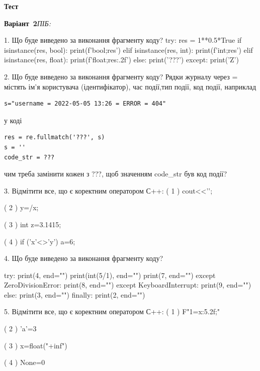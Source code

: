 \documentclass[11pt]{article}
\begin{document}
{\large\textbf{Тест}}

\textbf{Варіант \No\,2}\hfill \textit{ПІБ:}\,\underline{\hspace{60mm}}
\vspace{4mm}

1. Що буде виведено за виконання фрагменту коду?
try:
    res = 1**0.5*True
    if isinstance(res, bool):
        print(f'bool;{res}')
    elif isinstance(res, int):
        print(f'int;{res}')
    elif isinstance(res, float):
        print(f'float;{res:.2f}')
    else:
        print('???')
except:
    print('Z')


2. Що буде виведено за виконання фрагменту коду?
Рядки журналу через = містять ім'я користувача (ідентифікатор), час події,тип події, код події, наприклад
\begin{verbatim}
s="username = 2022-05-05 13:26 = ERROR = 404"
\end{verbatim}
у коді 
\begin{verbatim}
res = re.fullmatch('???', s) 
s = ''
code_str = ??? 
\end{verbatim}
чим треба замінити кожен з ???, щоб значенням code\_str був код події? 




3. %
Відмітити все, що є коректним оператором С++:
( 1 ) cout<<'\n';

( 2 ) y=/x;

( 3 ) int z=3.1415;

( 4 ) if ('x'<>'y') a=6;


4. Що буде виведено за виконання фрагменту коду?

try:
    print(4, end="")
    print(int(5/1), end="")
    print(7, end="")
except ZeroDivisionError: 
    print(8, end="")
except KeyboardInterrupt: 
    print(9, end="")
else:
    print(3, end="")
finally:
    print(2, end="")



5. %
Відмітити все, що є коректним оператором С++:
( 1 ) F"1={x:5.2f};"

( 2 ) 'a'=3

( 3 ) x=float("+inf")

( 4 ) None=0


\newpage
\end{document}
